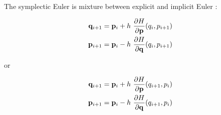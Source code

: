 The symplectic Euler is mixture between explicit and implicit Euler \cite{Hairer}:

\begin{equation}
    \begin{split} \label{eq:symplectic-euler1}
        \mathbf{q}_{i+1} = \mathbf{p}_i + h \operatorname{}\frac{\partial H}{\partial \mathbf{p}}(q_i, p_{i+1}) \\
        \mathbf{p}_{i+1} = \mathbf{p}_i - h \operatorname{}\frac{\partial H}{\partial \mathbf{q}}(q_i, p_{i+1})
    \end{split}
\end{equation}

or

\begin{equation}
    \begin{split} \label{eq:symplectic-euler2}
        \mathbf{q}_{i+1} = \mathbf{p}_i + h \operatorname{}\frac{\partial H}{\partial \mathbf{p}}(q_{i+1}, p_i) \\
        \mathbf{p}_{i+1} = \mathbf{p}_i - h \operatorname{}\frac{\partial H}{\partial \mathbf{q}}(q_{i+1}, p_i)
    \end{split}
\end{equation}

